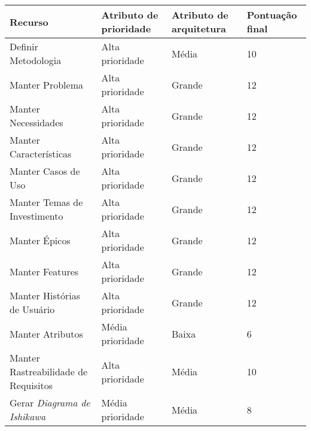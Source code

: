\begin{table}[H]
\centering
\begin{tabular}{|l|C{3cm}|C{3cm}|l|}

\hline
\textbf{Recurso} &
\textbf{Atributo de prioridade} &
\small{\textbf{Atributo de arquitetura}} &
\textbf{Pontuação final}
\\ \hline

Definir Metodologia & 
Alta prioridade &
Média &
10
 \\ \hline

Manter Problema &
Alta prioridade &
Grande &
12
 \\ \hline
 
Manter Necessidades &
Alta prioridade &
Grande &
12
 \\ \hline
 
Manter Características &
Alta prioridade &
Grande &
12
 \\ \hline
 
Manter Casos de Uso &
Alta prioridade &
Grande &
12
 \\ \hline
 
Manter Temas de Investimento &
Alta prioridade &
Grande &
12
 \\ \hline
 
Manter Épicos &
Alta prioridade &
Grande &
12
 \\ \hline
 
Manter Features &
Alta prioridade &
Grande &
12
 \\ \hline
 
Manter Histórias de Usuário &
Alta prioridade &
Grande &
12
 \\ \hline
 
Manter Atributos &
Média prioridade &
Baixa &
6
 \\ \hline
 
Manter Rastreabilidade de Requisitos &
Alta prioridade &
Média &
10
 \\ \hline
 
Gerar \textit{Diagrama de Ishikawa} &
Média prioridade &
Média &
8
 \\ \hline
 

\end{tabular}
\end{table}

